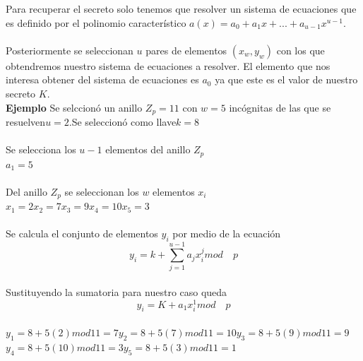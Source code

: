 \documentclass[12pt,oneside,onecolumn,openany]{report}
\begin{document}
Para recuperar el secreto solo tenemos que resolver un sistema de ecuaciones que es definido por el polinomio característico $a(x)=a_0+a_1x+...+a_{u-1}x^{u-1}$.
\\
\\
Posteriormente se seleccionan $u$ pares de elementos $(x_w,y_w)$ con los que obtendremos nuestro sistema de ecuaciones a resolver. El elemento que nos interesa obtener del sistema de ecuaciones es $a_0$ ya que este es el valor de nuestro secreto $K$.
\\
\textbf{Ejemplo}
Se selccion\'o un anillo  $Z_p=11$\hspace{0,4cm} con \hspace{0,4cm}$w=5$\hspace{0,4cm} incógnitas de las que se resuelven\hspace{0,4cm}$u=2$.\hspace{0,4cm}Se seleccion\'o como llave\hspace{0,4cm}$k=8$\hspace{1cm}
\\ 
\\
Se selecciona los $u-1$ elementos del anillo $Z_p$\\
$a_1=5$ 
\\
\\
Del anillo $Z_p$ se seleccionan los $w$ elementos $x_i$\\
$x_1=2$\hspace{1cm}$x_2=7$\hspace{1cm}$x_3=9$\hspace{1cm}$x_4=10$\hspace{1cm}$x_5=3$\\
\\
Se calcula el conjunto de elementos $y_i$ por medio de la ecuaci\'on 
\begin{equation}
 y_i=k+\sum_{j=1}^{u-1} a_j x_i^j mod \quad p
\end{equation}
\\
Sustituyendo la sumatoria para nuestro caso queda
\\
\begin{equation}
 y_i=K+a_1x_i^1mod \quad p
\end{equation}
\\
$y_1=8+5(2)mod11=7$\hspace{3,5cm}$y_2=8+5(7)mod11=10$\hspace{3,5cm}$y_3=8+5(9)mod11=9$\hspace{3,5cm}$y_4=8+5(10)mod11=3$\hspace{3,5cm}$y_5=8+5(3)mod11=1$\\
\end{document}
